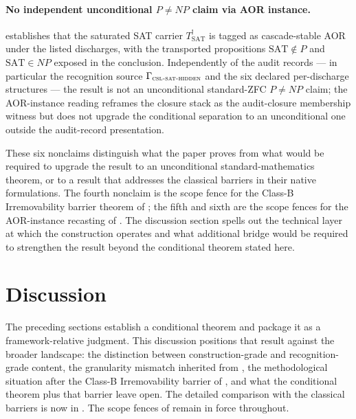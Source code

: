 \documentclass[11pt]{article}
\newcommand{\Tsat}{T^{!}_{\mathrm{SAT}}}
\newcommand{\CSLSATHidden}{\Gamma_{\textsc{csl-sat-hidden}}}
\theoremstyle{definition}
\begin{document}
\paragraph{No independent unconditional \(P\neq NP\) claim via AOR instance.}
\label{nonclaim:pvnp:aor-instance-no-unconditional}
 establishes that the saturated SAT
carrier \(\Tsat\) is tagged as cascade-stable AOR under the listed
discharges, with the transported propositions \(\mathrm{SAT}\notin P\)
and \(\mathrm{SAT}\in NP\) exposed in the conclusion.  Independently
of the audit records ---
in particular the recognition source \(\CSLSATHidden\) and the
six declared per-discharge structures --- the result is not an
unconditional standard-ZFC \(P\neq NP\) claim; the AOR-instance
reading reframes the closure stack as the audit-closure membership
witness but does not upgrade the conditional separation to an
unconditional one outside the audit-record presentation.

These six nonclaims distinguish what the paper proves from what
would be required to upgrade the result to an unconditional
standard-mathematics theorem, or to a result that addresses the
classical barriers in their native formulations.  The fourth nonclaim
is the scope fence for the Class-B Irremovability barrier theorem of
; the fifth and sixth are the scope fences
for the AOR-instance recasting of
.  The discussion section spells out the
technical layer at which the construction operates and what additional
bridge would be required to strengthen the result beyond the
conditional theorem stated here.
 

\section{Discussion}
\label{sec:discussion}

The preceding sections establish a conditional theorem and package it
as a framework-relative judgment.  This discussion positions that
result against the broader landscape: the distinction between
construction-grade and recognition-grade content, the granularity
mismatch inherited from \citet{TsiokosHiddenness2026}, the
methodological situation after the Class-B Irremovability barrier of
, and what the conditional theorem plus that
barrier leave open.  The detailed comparison with the classical
barriers is now in .  The scope fences
of  remain in force throughout.
\end{document}
